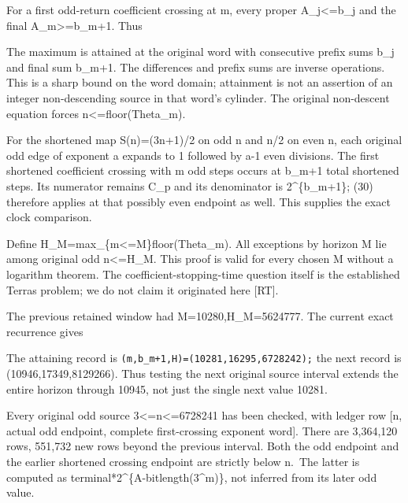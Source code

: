 
For a first odd-return coefficient crossing at m, every proper
A\_j\textless=b\_j and the final A\_m\textgreater=b\_m+1. Thus


The maximum is attained at the original word with consecutive prefix
sums b\_j and final sum b\_m+1. The differences and prefix sums are
inverse operations. This is a sharp bound on the word domain; attainment
is not an assertion of an integer non-descending source in that word's
cylinder. The original non-descent equation forces
n\textless=floor(Theta\_m).

For the shortened map S(n)=(3n+1)/2 on odd n and n/2 on even n, each
original odd edge of exponent a expands to 1 followed by a-1 even
divisions. The first shortened coefficient crossing with m odd steps
occurs at b\_m+1 total shortened steps. Its numerator remains C\_p and
its denominator is 2\^{}\{b\_m+1\}; (30) therefore applies at that
possibly even endpoint as well. This supplies the exact clock
comparison.

Define H\_M=max\_\{m\textless=M\}floor(Theta\_m). All exceptions by
horizon M lie among original odd n\textless=H\_M. This proof is valid
for every chosen M without a logarithm theorem. The
coefficient-stopping-time question itself is the established Terras
problem; we do not claim it originated here {[}RT{]}.

The previous retained window had M=10280,H\_M=5624777. The current exact
recurrence gives


The attaining record is \nolinkurl{(m,b_m+1,H)=(10281,16295,6728242);}
the next record is (10946,17349,8129266). Thus testing the next original
source interval extends the entire horizon through 10945, not just the
single next value 10281.

Every original odd source 3\textless=n\textless=6728241 has been
checked, with ledger row {[}n, actual odd endpoint, complete
first-crossing exponent word{]}. There are 3,364,120 rows, 551,732 new
rows beyond the previous interval. Both the odd endpoint and the earlier
shortened crossing endpoint are strictly below n.~The latter is computed
as terminal*2\^{}\{A-bitlength(3\^{}m)\}, not inferred from its later
odd value.

